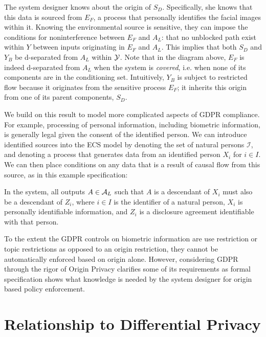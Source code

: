 \documentclass[../thesis.tex]{subfiles}
\begin{document}
The system designer knows about the origin of $S_D$.
Specifically, she knows that this data is sourced from $E_F$,
a process that personally identifies the facial images
within it.
Knowing the environmental source is sensitive,
they can impose the conditions for noninterference between
$E_F$ and $A_L$: that no unblocked path exist within $Y$ between
inputs originating in $E_F$ and $A_L$.
This implies that both $S_D$ and $Y_B$ be d-separated
from $A_L$ within $\mathcal{Y}$.
Note that in the diagram above, $E_F$ is indeed d-separated
from $A_L$ when the system is \emph{covered}, i.e.
when none of its components are in the conditioning set.
Intuitively, $Y_B$ is subject to restricted flow because
it originates from the sensitive process $E_F$; it
inherits this origin from one of its parent components,
$S_D$.

We build on this result to model more complicated aspects
of GDPR compliance.
For example, processing of personal information, including
biometric information, is generally legal given the consent
of the identified person.
We can introduce identified sources into the ECS model
by denoting the set of natural persons $\mathcal{I}$,
and denoting a process that generates data from
an identified person $X_i$ for $i \in I$.
We can then place conditions on any data that is
a result of causal flow from this source, as
in this example specification:

\begin{exm}
In the system, all outputs $A \in \mathcal{A}_L$ such that
$A$ is a descendant of $X_i$ must also be a descendant
of $Z_i$, where $i \in I$ is the identifier of a natural person,
$X_i$ is personally identifiable information, and
$Z_i$ is a disclosure agreement identifiable with that person.
\end{exm}

To the extent the GDPR controls on biometric information are
use restriction or topic restrictions
as opposed to an origin restriction,
they cannot be automatically enforced based on origin alone.
However, considering GDPR through the rigor of Origin Privacy
clarifies some of its requirements as formal specification
shows what knowledge is needed by the system designer for
origin based policy enforcement.

\section{Relationship to Differential Privacy}
\label{sec:differential}
\end{document}
